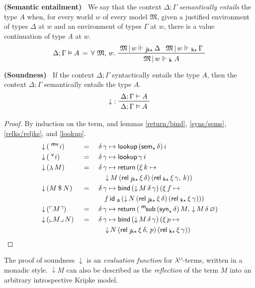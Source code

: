 \documentclass{entcs}
\numberwithin{equation}{thm}
\newcommand{\lambdabox}{\lambda^{\mkern-1mu\sq\mkern-2mu}}
\newcommand{\tsf}[1]{\textsf{\upshape{#1}}}
\newcommand{\stsf}[1]{\smash{\tsf{\small{#1}}}}
\renewcommand{\:}{\mathrel{:}}
\newcommand{\tyrule}[1]{\prftree[l]{${#1} \:\,$}}
\let\oldforall\forall
\renewcommand{\forall}{\oldforall\,}
\newcommand{\0}{\varnothing}
\newcommand{\sq}{\Box}
\renewcommand{\e}{\mathrel{\vdash}}
\newcommand{\mvar}{\operatorname{^{\stsf{mv}\mkern-2mu}}}
\newcommand{\var}{\operatorname{^{\stsf{v}\mkern-2mu}}}
\newcommand{\lam}{\operatorname{\lambda}}
\newcommand{\app}{\mathbin{\$}}
\newcommand{\quo}[1]{\mathopen{\ulcorner}{#1}\mathclose{\urcorner}}
\newcommand{\unq}[1]{\mathopen{\llcorner}{#1}\mathclose{\lrcorner}\,}
\newcommand{\msub}{\operatorname{^{\stsf{m}\mkern-2mu}\tsf{sub}}}
\newcommand{\M}{\mathfrak{M}}
\newcommand{\Mover}{\M\,|\,}
\newcommand{\ida}{\operatorname{\tsf{id}_{\stsf{a}}}}
\newcommand{\eek}{\mathrel{\Vdash_{\stsf{k}}}}
\newcommand{\eeks}{\mathrel{\Vdash_{\stsf{k}\star\mkern-2mu}}}
\newcommand{\eejks}{\mathrel{\Vdash_{\stsf{jk}\star\mkern-2mu}}}
\newcommand{\syns}{\operatorname{\tsf{syn}_{\star}}}
\newcommand{\sems}{\operatorname{\tsf{sem}_{\star}}}
\newcommand{\eeq}{\mathrel{\vDash}}
\newcommand{\relks}{\operatorname{\tsf{rel}_{\stsf{k}\star}}}
\newcommand{\reljks}{\operatorname{\tsf{rel}_{\stsf{jk}\star}}}
\newcommand{\return}{\operatorname{\tsf{return}}}
\newcommand{\bind}{\operatorname{\tsf{bind}}}
\newcommand{\lookup}{\operatorname{\tsf{lookup}}}
\newcommand{\reflect}{\operatorname{\downarrow}}
\begin{document}
\begin{definition}
  \textbf{(Semantic entailment)\ }
  \label{eeq}
  We say that the context $\Delta; \Gamma$ \emph{semantically entails} the type $A$ when, for every world $w$ of every model $\M$, given a justified environment of types $\Delta$ at $w$ and an environment of types $\Gamma$ at $w$, there is a value continuation of type $A$ at $w$.
  \begin{gather*}
    \Delta; \Gamma \eeq A \,=\, \forall \M,\,w.\ \raisebox{-8pt}{$\prftree{\Mover w \eejks \Delta}{\Mover w \eeks \Gamma}{\Mover w \eek A}$}
  \end{gather*}
\end{definition}

\begin{theorem}
  \normalshape
  \textbf{(Soundness)\ }
  \label{reflect}
  If the context $\Delta; \Gamma$ syntactically entails the type $A$, then the context $\Delta; \Gamma$ semantically entails the type $A$.
  \begin{gather*}
    \tyrule{\reflect}{\Delta; \Gamma \e A}{\Delta; \Gamma \eeq A}
  \end{gather*}
  \itshape
  \pagebreak %
  \begin{proof}
    \normalshape
    By induction on the term, and lemmas \ref{return/bind}, \ref{syns/sems}, \ref{relks/reljks}, and \ref{lookup}.
    \begin{alignat}{3}
      \label{reflect.mvar} & \reflect\, (\mvar i)    \,&&=\, &&\,\delta\, \gamma \mapsto \lookup\, (\sems \delta)\, i\\
      \label{reflect.var}  & \reflect\, (\var i)     \,&&=\, &&\,\delta\, \gamma \mapsto \lookup \gamma\, i\\
      \label{reflect.lam}  & \reflect\, (\lam M)     \,&&=\, &&\,\delta\, \gamma \mapsto \return\, (\xi\,k \mapsto\\
      \nonumber            & && && \quad \reflect M\, (\reljks \xi\, \delta)\, (\relks \xi\, \gamma,\, k))\\
      \label{reflect.app}  & \reflect\, (M \app N) \,&&=\, &&\,\delta\, \gamma \mapsto \bind\, (\reflect M\, \delta\, \gamma)\, (\xi\,f \mapsto\\
      \nonumber            & && && \quad f \ida\, (\reflect N\, (\reljks \xi\, \delta)\, (\relks \xi\, \gamma)))\\
      \label{reflect.quo}  & \reflect\, (\quo{M})   \,&&=\, &&\,\delta\, \gamma \mapsto \return\, (\msub\, (\syns \delta)\, M,\, \reflect M\, \delta\, \0)\\
      \label{reflect.unq}  & \reflect\, (\unq{M} N) \,&&=\, &&\,\delta\, \gamma \mapsto \bind\, (\reflect M\, \delta\, \gamma)\, (\xi\,p \mapsto\\
      \nonumber            & && && \quad \reflect N\, (\reljks \xi\, \delta,\, p)\, (\relks \xi\, \gamma))
    \end{alignat}
  \end{proof}
\end{theorem}
\noindent
The proof of soundness $\reflect$ is an \emph{evaluation function} for $\lambdabox$-terms, written in a monadic style.
$\reflect M$ can also be described as the \emph{reflection} of the term $M$ into an arbitrary introspective Kripke model.
\end{document}
